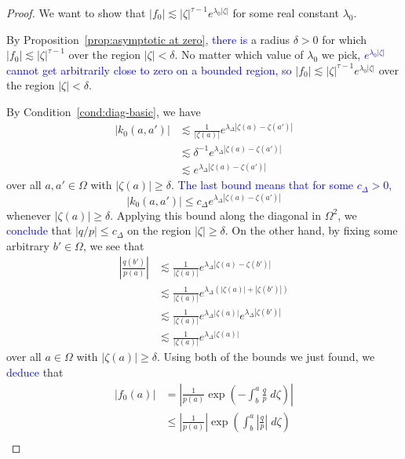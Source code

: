 \documentclass[review]{siamart220329}
\newcommand{\hardker}{k_0}
\newcommand{\solproto}{f_0}
\newcommand{\domain}{\Omega}
\begin{document}
\begin{proof}
We want to show that $|\solproto| \lesssim |\zeta|^{\tau-1} e^{\lambda_0|\zeta|}$ for some real constant $\lambda_0$.

By Proposition~\ref{prop:asymptotic at zero}, \textcolor{blue}{there is} a radius $\delta > 0$ for which $|\solproto| \lesssim |\zeta|^{\tau-1}$ over the region $|\zeta| < \delta$. No matter which value of $\lambda_0$ we pick, \textcolor{blue}{$e^{\lambda_0|\zeta|}$ cannot get arbitrarily close to zero on a bounded region, so} $|\solproto| \lesssim |\zeta|^{\tau-1} e^{\lambda_0|\zeta|}$ over the region $|\zeta| < \delta$.

By Condition~\eqref{cond:diag-basic}, we have
\begin{align*}
|\hardker(a, a')| & \lesssim \frac{1}{|\zeta(a)|} e^{\lambda_\Delta |\zeta(a) - \zeta(a')|} \\
& \lesssim \delta^{-1} e^{\lambda_\Delta |\zeta(a) - \zeta(a')|} \\
& \lesssim e^{\lambda_\Delta |\zeta(a) - \zeta(a')|}
\end{align*}
over all $a, a' \in \domain$ with $|\zeta(a)| \ge \delta$. \textcolor{blue}{The last bound means that for some $c_\Delta > 0$,}
\[ |\hardker(a, a')| \le c_\Delta e^{\lambda_\Delta |\zeta(a) - \zeta(a')|} \]
whenever $|\zeta(a)| \ge \delta$. Applying this bound along the diagonal in $\domain^2$, we \textcolor{blue}{conclude} that $|q/p| \le c_\Delta$ on the region $|\zeta| \ge \delta$. On the other hand, by fixing some arbitrary  $b' \in \domain$, we see that
\begin{align*}
\left|\frac{q(b')}{p(a)}\right| & \lesssim \frac{1}{|\zeta(a)|} e^{\lambda_\Delta|\zeta(a) - \zeta(b')|} \\
& \lesssim \frac{1}{|\zeta(a)|} e^{\lambda_\Delta(|\zeta(a)| + |\zeta(b')|)} \\
& \lesssim \frac{1}{|\zeta(a)|} e^{\lambda_\Delta|\zeta(a)|} e^{\lambda_\Delta|\zeta(b')|} \\
& \lesssim \frac{1}{|\zeta(a)|} e^{\lambda_\Delta|\zeta(a)|}
\end{align*}
over all $a \in \domain$ with $|\zeta(a)| \ge \delta$. Using both of the bounds we just found, we \textcolor{blue}{deduce} that
\begin{align*}
|\solproto(a)| & = \left| \frac{1}{p(a)} \exp\left(-\int_{b}^{a}\frac{q}{p}\;d\zeta\right) \right| \\
& \le \left|\frac{1}{p(a)}\right| \exp\left(\int_{b}^{a}\left|\frac{q}{p}\right|\;d\zeta\right) \\

\end{align*}
\end{proof}
\end{document}
